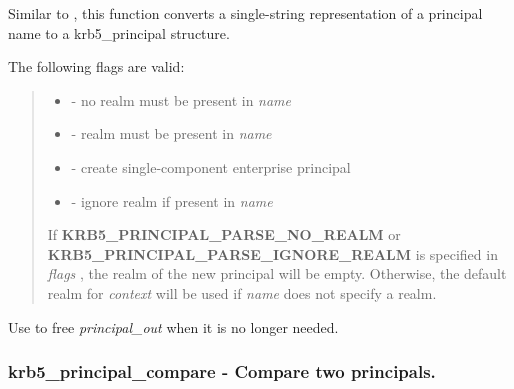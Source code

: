 \documentclass[letterpaper,10pt,english]{sphinxmanual}
\begin{document}
Similar to {\hyperref[appdev/refs/api/krb5_parse_name:c.krb5_parse_name]{}} , this function converts a single-string representation of a principal name to a krb5\_principal structure.

The following flags are valid:
\begin{quote}
\begin{itemize}
\item {} 
{\hyperref[appdev/refs/macros/KRB5_PRINCIPAL_PARSE_NO_REALM:KRB5_PRINCIPAL_PARSE_NO_REALM]{}} - no realm must be present in \emph{name}

\item {} 
{\hyperref[appdev/refs/macros/KRB5_PRINCIPAL_PARSE_REQUIRE_REALM:KRB5_PRINCIPAL_PARSE_REQUIRE_REALM]{}} - realm must be present in \emph{name}

\item {} 
{\hyperref[appdev/refs/macros/KRB5_PRINCIPAL_PARSE_ENTERPRISE:KRB5_PRINCIPAL_PARSE_ENTERPRISE]{}} - create single-component enterprise principal

\item {} 
{\hyperref[appdev/refs/macros/KRB5_PRINCIPAL_PARSE_IGNORE_REALM:KRB5_PRINCIPAL_PARSE_IGNORE_REALM]{}} - ignore realm if present in \emph{name}

\end{itemize}

If \textbf{KRB5\_PRINCIPAL\_PARSE\_NO\_REALM} or \textbf{KRB5\_PRINCIPAL\_PARSE\_IGNORE\_REALM} is specified in \emph{flags} , the realm of the new principal will be empty. Otherwise, the default realm for \emph{context} will be used if \emph{name} does not specify a realm.
\end{quote}

Use {\hyperref[appdev/refs/api/krb5_free_principal:c.krb5_free_principal]{}} to free \emph{principal\_out} when it is no longer needed.


\subsubsection{krb5\_principal\_compare -  Compare two principals.}
\label{appdev/refs/api/krb5_principal_compare:krb5-principal-compare-compare-two-principals}\label{appdev/refs/api/krb5_principal_compare::doc}
\end{document}
